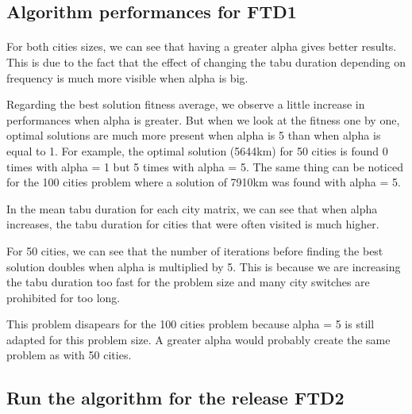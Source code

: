 \documentclass[12pt,oneside,a4paper]{article}
\begin{document}
\subsection{Algorithm performances for FTD1}
\paragraph{}
For both cities sizes, we can see that having a greater alpha gives better results.
This is due to the fact that the effect of changing the tabu duration depending
on frequency is much more visible when alpha is big.

Regarding the best solution fitness average, we observe a little increase in
performances when alpha is greater. But when we look at the fitness one by one,
optimal solutions are much more present when alpha is 5 than when alpha is equal to 1.
For example, the optimal solution (5644km) for 50 cities is found 0 times with alpha = 1 but
5 times with alpha = 5. The same thing can be noticed for the 100 cities problem where
a solution of 7910km was found with alpha = 5.

In the mean tabu duration for each city matrix, we can see that when alpha increases, the tabu
duration for cities that were often visited is much higher.

For 50 cities, we can see that the number of iterations before finding the best solution
doubles when alpha is multiplied by 5. This is because we are increasing the tabu duration
too fast for the problem size and many city switches are prohibited for too long. 

This problem disapears for the 100 cities problem because alpha = 5 is still adapted for
this problem size. A greater alpha would probably create the same problem as with 50 cities.


\subsection{Run the algorithm for the release FTD2}
\end{document}

